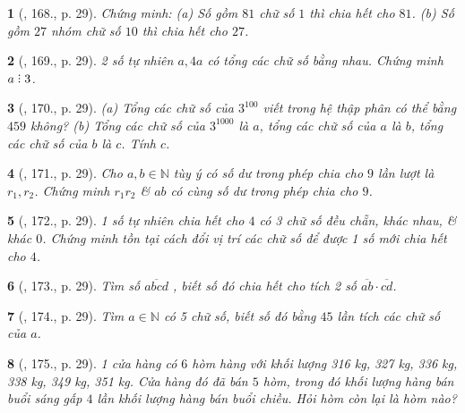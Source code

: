 \documentclass{article}
\newtheorem{baitoan}{}
\DeclareRobustCommand{\divby}{%
	\mathrel{\vbox{\baselineskip.65ex\lineskiplimit0pt\hbox{.}\hbox{.}\hbox{.}}}%
}
\begin{document}
\begin{baitoan}[\cite{Binh_Toan_6_tap_1}, 168., p. 29]
	Chứng minh: (a) Số gồm $81$ chữ số $1$ thì chia hết cho $81$. (b) Số gồm $27$ nhóm chữ số $10$ thì chia hết cho $27$.
\end{baitoan}

\begin{baitoan}[\cite{Binh_Toan_6_tap_1}, 169., p. 29]
	2 số tự nhiên $a,4a$ có tổng các chữ số bằng nhau. Chứng minh $a\divby3$.
\end{baitoan}

\begin{baitoan}[\cite{Binh_Toan_6_tap_1}, 170., p. 29]
	(a) Tổng các chữ số của $3^{100}$ viết trong hệ thập phân có thể bằng $459$ không? (b) Tổng các chữ số của $3^{1000}$ là $a$, tổng các chữ số của $a$ là $b$, tổng các chữ số của $b$ là $c$. Tính $c$.
\end{baitoan}

\begin{baitoan}[\cite{Binh_Toan_6_tap_1}, 171., p. 29]
	Cho $a,b\in\mathbb{N}$ tùy ý có số dư trong phép chia cho $9$ lần lượt là $r_1,r_2$. Chứng minh $r_1r_2$ \& $ab$ có cùng số dư trong phép chia cho $9$.
\end{baitoan}

\begin{baitoan}[\cite{Binh_Toan_6_tap_1}, 172., p. 29]
	1 số tự nhiên chia hết cho $4$ có 3 chữ số đều chẵn, khác nhau, \& khác $0$. Chứng minh tồn tại cách đổi vị trí các chữ số để được 1 số mới chia hết cho $4$.
\end{baitoan}

\begin{baitoan}[\cite{Binh_Toan_6_tap_1}, 173., p. 29]
	Tìm số $\overline{abcd}$ , biết số đó chia hết cho tích 2 số $\overline{ab}\cdot\overline{cd}$.
\end{baitoan}

\begin{baitoan}[\cite{Binh_Toan_6_tap_1}, 174., p. 29]
	Tìm $a\in\mathbb{N}$ có 5 chữ số, biết số đó bằng $45$ lần tích các chữ số của $a$.
\end{baitoan}

\begin{baitoan}[\cite{Binh_Toan_6_tap_1}, 175., p. 29]
	1 cửa hàng có $6$ hòm hàng với khối lượng {\rm316 kg, 327 kg, 336 kg, 338 kg, 349 kg, 351 kg}. Cửa hàng đó đã bán $5$ hòm, trong đó khối lượng hàng bán buổi sáng gấp $4$ lần khối lượng hàng bán buổi chiều. Hỏi hòm còn lại là hòm nào?
\end{baitoan}
\end{document}
